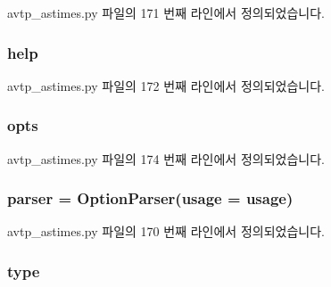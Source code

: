 avtp\+\_\+astimes.\+py 파일의 171 번째 라인에서 정의되었습니다.

\subsubsection[{\texorpdfstring{help}{help}}]{\setlength{\rightskip}{0pt plus 5cm}help}\hypertarget{namespaceavtp__astimes_a81ae9faedaa69e3e28e2960a0548df8d}{}\label{namespaceavtp__astimes_a81ae9faedaa69e3e28e2960a0548df8d}


avtp\+\_\+astimes.\+py 파일의 172 번째 라인에서 정의되었습니다.

\subsubsection[{\texorpdfstring{opts}{opts}}]{\setlength{\rightskip}{0pt plus 5cm}opts}\hypertarget{namespaceavtp__astimes_aa17b9f50d41f0a8e95659986136435dd}{}\label{namespaceavtp__astimes_aa17b9f50d41f0a8e95659986136435dd}


avtp\+\_\+astimes.\+py 파일의 174 번째 라인에서 정의되었습니다.

\subsubsection[{\texorpdfstring{parser}{parser}}]{\setlength{\rightskip}{0pt plus 5cm}parser = Option\+Parser({\bf usage} = {\bf usage})}\hypertarget{namespaceavtp__astimes_a90eee7a4677ca8b1ed116364a24367f9}{}\label{namespaceavtp__astimes_a90eee7a4677ca8b1ed116364a24367f9}


avtp\+\_\+astimes.\+py 파일의 170 번째 라인에서 정의되었습니다.

\subsubsection[{\texorpdfstring{type}{type}}]{\setlength{\rightskip}{0pt plus 5cm}type}\hypertarget{namespaceavtp__astimes_a7aead736a07eaf25623ad7bfa1f0ee2d}{}\label{namespaceavtp__astimes_a7aead736a07eaf25623ad7bfa1f0ee2d}



